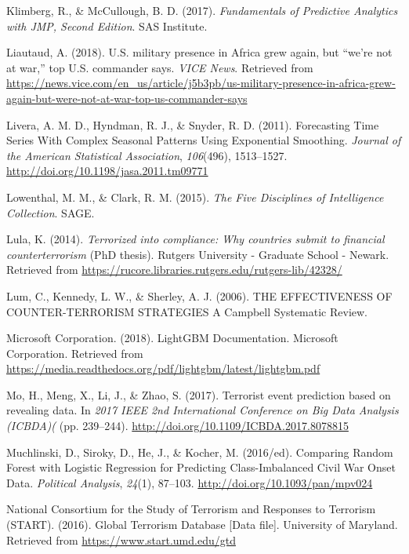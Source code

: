 \documentclass[11pt,oneside,a4paper]{reedthesis}
\begin{document}
\hypertarget{ref-Klimberg_2017}{}
Klimberg, R., \& McCullough, B. D. (2017). \emph{Fundamentals of
Predictive Analytics with JMP, Second Edition}. SAS Institute.

\hypertarget{ref-Liautaud_2018}{}
Liautaud, A. (2018). U.S. military presence in Africa grew again, but
``we're not at war,'' top U.S. commander says. \emph{VICE News}.
Retrieved from
\url{https://news.vice.com/en_us/article/j5b3pb/us-military-presence-in-africa-grew-again-but-were-not-at-war-top-us-commander-says}

\hypertarget{ref-Livera_2011}{}
Livera, A. M. D., Hyndman, R. J., \& Snyder, R. D. (2011). Forecasting
Time Series With Complex Seasonal Patterns Using Exponential Smoothing.
\emph{Journal of the American Statistical Association}, \emph{106}(496),
1513--1527. \url{http://doi.org/10.1198/jasa.2011.tm09771}

\hypertarget{ref-Lowenthal_2015}{}
Lowenthal, M. M., \& Clark, R. M. (2015). \emph{The Five Disciplines of
Intelligence Collection}. SAGE.

\hypertarget{ref-Lula_2014}{}
Lula, K. (2014). \emph{Terrorized into compliance: Why countries submit
to financial counterterrorism} (PhD thesis). Rutgers University -
Graduate School - Newark. Retrieved from
\url{https://rucore.libraries.rutgers.edu/rutgers-lib/42328/}

\hypertarget{ref-Lum_2006}{}
Lum, C., Kennedy, L. W., \& Sherley, A. J. (2006). THE EFFECTIVENESS OF
COUNTER-TERRORISM STRATEGIES A Campbell Systematic Review.

\hypertarget{ref-MicrosoftCorporation_2018}{}
Microsoft Corporation. (2018). LightGBM Documentation. Microsoft
Corporation. Retrieved from
\url{https://media.readthedocs.org/pdf/lightgbm/latest/lightgbm.pdf}

\hypertarget{ref-Mo_2017}{}
Mo, H., Meng, X., Li, J., \& Zhao, S. (2017). Terrorist event prediction
based on revealing data. In \emph{2017 IEEE 2nd International Conference
on Big Data Analysis (ICBDA)(} (pp. 239--244).
\url{http://doi.org/10.1109/ICBDA.2017.8078815}

\hypertarget{ref-Muchlinski_2016}{}
Muchlinski, D., Siroky, D., He, J., \& Kocher, M. (2016/ed). Comparing
Random Forest with Logistic Regression for Predicting Class-Imbalanced
Civil War Onset Data. \emph{Political Analysis}, \emph{24}(1), 87--103.
\url{http://doi.org/10.1093/pan/mpv024}

\hypertarget{ref-NationalConsortiumfortheStudyofTerrorismandResponsestoTerrorismSTART_2016}{}
National Consortium for the Study of Terrorism and Responses to
Terrorism (START). (2016). Global Terrorism Database {[}Data file{]}.
University of Maryland. Retrieved from
\url{https://www.start.umd.edu/gtd}
\end{document}
